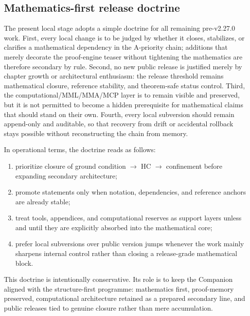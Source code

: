 \subsection*{Mathematics-first release doctrine}
The present local stage adopts a simple doctrine for all remaining pre-v2.27.0 work. First, every local change is to be judged by whether it closes, stabilizes, or clarifies a mathematical dependency in the A-priority chain; additions that merely decorate the proof-engine teaser without tightening the mathematics are therefore secondary by rule. Second, no new public release is justified merely by chapter growth or architectural enthusiasm: the release threshold remains mathematical closure, reference stability, and theorem-safe status control. Third, the computational/MML/MMA/MCP layer is to remain visible and preserved, but it is not permitted to become a hidden prerequisite for mathematical claims that should stand on their own. Fourth, every local subversion should remain append-only and auditable, so that recovery from drift or accidental rollback stays possible without reconstructing the chain from memory.

In operational terms, the doctrine reads as follows:
\begin{enumerate}[label=(\roman*)]
  \item prioritize closure of ground condition $\rightarrow$ HC $\rightarrow$ confinement before expanding secondary architecture;
  \item promote statements only when notation, dependencies, and reference anchors are already stable;
  \item treat tools, appendices, and computational reserves as support layers unless and until they are explicitly absorbed into the mathematical core;
  \item prefer local subversions over public version jumps whenever the work mainly sharpens internal control rather than closing a release-grade mathematical block.
\end{enumerate}

This doctrine is intentionally conservative. Its role is to keep the Companion aligned with the structure-first programme: mathematics first, proof-memory preserved, computational architecture retained as a prepared secondary line, and public releases tied to genuine closure rather than mere accumulation.


